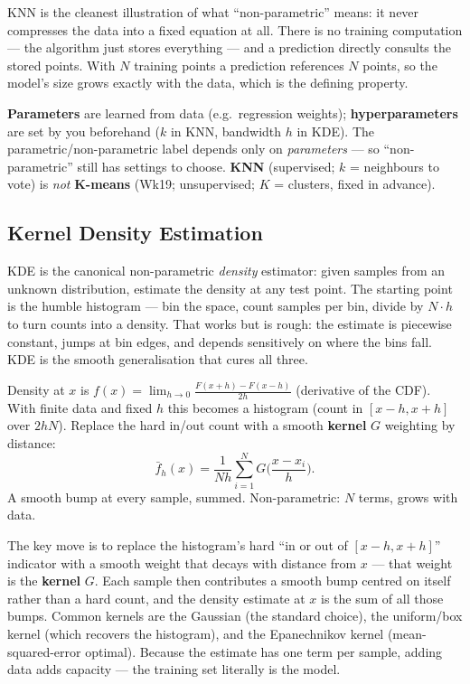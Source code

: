 \documentclass[11pt, a4paper]{article}
\newcommand{\kw}[1]{\textbf{#1}}
\begin{document}
KNN is the cleanest illustration of what ``non-parametric'' means: it never compresses the data into
a fixed equation at all. There is no training computation — the algorithm just stores everything —
and a prediction directly consults the stored points. With $N$ training points a prediction
references $N$ points, so the model's size grows exactly with the data, which is the defining
property.

\begin{trapbox}
\kw{Parameters} are learned from data (e.g.\ regression weights); \kw{hyperparameters} are set by you
beforehand ($k$ in KNN, bandwidth $h$ in KDE). The parametric/non-parametric label depends only on
\emph{parameters} — so ``non-parametric'' still has settings to choose.
\kw{KNN} (supervised; $k$ = neighbours to vote) is \emph{not} \kw{K-means} (Wk19; unsupervised;
$K$ = clusters, fixed in advance).
\end{trapbox}

\subsection{Kernel Density Estimation}

KDE is the canonical non-parametric \emph{density} estimator: given samples from an unknown
distribution, estimate the density at any test point. The starting point is the humble histogram —
bin the space, count samples per bin, divide by $N\cdot h$ to turn counts into a density. That works
but is rough: the estimate is piecewise constant, jumps at bin edges, and depends sensitively on
where the bins fall. KDE is the smooth generalisation that cures all three.

\begin{defbox}[KDE]
Density at $x$ is $f(x)=\lim_{h\to0}\tfrac{F(x+h)-F(x-h)}{2h}$ (derivative of the CDF). With finite
data and fixed $h$ this becomes a histogram (count in $[x{-}h,x{+}h]$ over $2hN$). Replace the hard
in/out count with a smooth \kw{kernel} $G$ weighting by distance:
\[
\bar f_h(x)=\frac{1}{Nh}\sum_{i=1}^N G\!\Big(\frac{x-x_i}{h}\Big).
\]
A smooth bump at every sample, summed. Non-parametric: $N$ terms, grows with data.
\end{defbox}

The key move is to replace the histogram's hard ``in or out of $[x-h,x+h]$'' indicator with a smooth
weight that decays with distance from $x$ — that weight is the \kw{kernel} $G$. Each sample then
contributes a smooth bump centred on itself rather than a hard count, and the density estimate at
$x$ is the sum of all those bumps. Common kernels are the Gaussian (the standard choice), the
uniform/box kernel (which recovers the histogram), and the Epanechnikov kernel (mean-squared-error
optimal). Because the estimate has one term per sample, adding data adds capacity — the training set
literally is the model.
\end{document}
